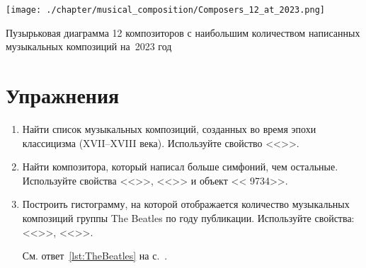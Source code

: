 \newpage
\begin{marginfigure}
  \texttt{[image: ./chapter/musical\_composition/Composers\_12\_at\_2023.png]}
  \caption[Диаграмма 12 композиторов с наибольшим количеством написанных музыкальных композиций на~2023 год]
          {Пузырьковая диаграмма 12 композиторов с наибольшим количеством написанных музыкальных композиций на~2023 год}%
  \label{fig:12composers}%
\end{marginfigure}


\section{Упражнения}
\begin{enumerate}
\item Найти список музыкальных композиций, созданных во время эпохи классицизма (XVII--XVIII века).
Используйте свойство <<>>.
\item Найти композитора, который написал больше симфоний, чем остальные. 
    Используйте свойства <<>>, <<>>
        и объект << {9734}>>.
\item Построить гистограмму, на которой отображается количество музыкальных композиций 
        группы The Beatles по году публикации.
        Используйте свойства: <<>>, <<>>.

        \label{question:TheBeatles_quest}
        См. ответ~\ref{lst:TheBeatles} на с.~\pageref{answer:TheBeatles_answ}.


\end{enumerate}
